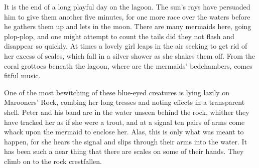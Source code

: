 

\begin{stagedir}
It is the end of a long playful day on the lagoon.
The sun's rays have persuaded him to give them another five minutes,
for one more race over the waters before he gathers them up and lets in the moon.
There are many mermaids here, going plop-plop,
and one might attempt to count the tails did they not flash and disappear so quickly.
At times a lovely girl leaps in the air seeking to get rid of her excess of scales,
which fall in a silver shower as she shakes them off.
From the coral grottoes beneath the lagoon, where are the mermaids' bedchambers, comes fitful music.

One of the most bewitching of these blue-eyed creatures is lying lazily on Marooners' Rock,
combing her long tresses and noting effects in a transparent shell.
Peter and his band are in the water unseen behind the rock,
whither they have tracked her as if she were a trout,
and at a signal ten pairs of arms come whack upon the mermaid to enclose her.
Alas, this is only what was meant to happen, for she hears the signal
and slips through their arms into the water.
It has been such a near thing that there are scales on some of their hands.
They climb on to the rock crestfallen.
\end{stagedir}

